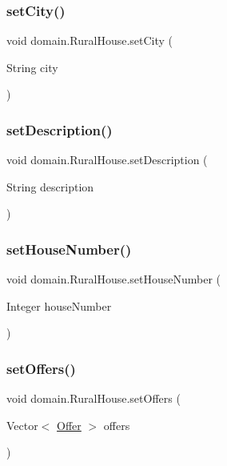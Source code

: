 \subsubsection{\texorpdfstring{setCity()}{setCity()}}
{\footnotesize\ttfamily void domain.\+Rural\+House.\+set\+City (\begin{DoxyParamCaption}\item[{String}]{city }\end{DoxyParamCaption})}

\mbox{\label{classdomain_1_1_rural_house_aff9ad2c8f775b473256233e9c26456f1}} 
\subsubsection{\texorpdfstring{setDescription()}{setDescription()}}
{\footnotesize\ttfamily void domain.\+Rural\+House.\+set\+Description (\begin{DoxyParamCaption}\item[{String}]{description }\end{DoxyParamCaption})}

\mbox{\label{classdomain_1_1_rural_house_afae7f7702581e18517472b1faa29273d}} 
\subsubsection{\texorpdfstring{setHouseNumber()}{setHouseNumber()}}
{\footnotesize\ttfamily void domain.\+Rural\+House.\+set\+House\+Number (\begin{DoxyParamCaption}\item[{Integer}]{house\+Number }\end{DoxyParamCaption})}

\mbox{\label{classdomain_1_1_rural_house_a64672c1962a8df6e8203f08f898404ba}} 
\subsubsection{\texorpdfstring{setOffers()}{setOffers()}}
{\footnotesize\ttfamily void domain.\+Rural\+House.\+set\+Offers (\begin{DoxyParamCaption}\item[{Vector$<$ \mbox{\hyperlink{classdomain_1_1_offer}{Offer}} $>$}]{offers }\end{DoxyParamCaption})}

